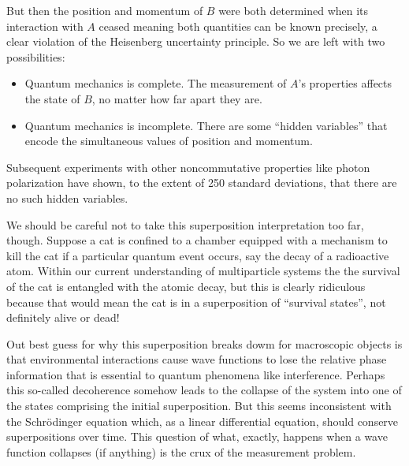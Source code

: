 \documentclass[../p052main.tex]{subfiles}
\begin{document}
But then the position and momentum of $B$ were both determined when its interaction with $A$ ceased meaning both quantities can be known precisely, a clear violation of the Heisenberg uncertainty principle.
So we are left with two possibilities:
\begin{itemize}
    \item Quantum mechanics is complete.
    The measurement of $A$'s properties affects the state of $B$, no matter how far apart they are.
    \item Quantum mechanics is incomplete.
    There are some ``hidden variables'' that encode the simultaneous values of position and momentum.
\end{itemize}
Subsequent experiments with other noncommutative properties like photon polarization have shown, to the extent of 250 standard deviations, that there are no such hidden variables.

We should be careful not to take this superposition interpretation too far, though.
Suppose a cat is confined to a chamber equipped with a mechanism to kill the cat if a particular quantum event occurs, say the decay of a radioactive atom.
Within our current understanding of multiparticle systems the the survival of the cat is entangled with the atomic decay, but this is clearly ridiculous because that would mean the cat is in a superposition of ``survival states'', not definitely alive or dead!

Out best guess for why this superposition breaks dowm for macroscopic objects is that environmental interactions cause wave functions to lose the relative phase information that is essential to quantum phenomena like interference.
Perhaps this so-called decoherence somehow leads to the collapse of the system into one of the states comprising the initial superposition.
But this seems inconsistent with the Schrödinger equation which, as a linear differential equation, should conserve superpositions over time.
This question of what, exactly, happens when a wave function collapses (if anything) is the crux of the measurement problem.
\end{document}
